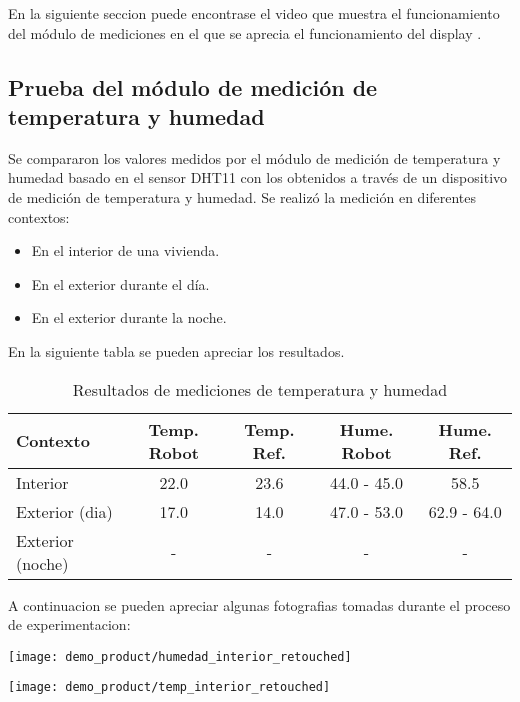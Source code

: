 En la siguiente seccion puede encontrase el video que muestra el funcionamiento del módulo de mediciones en el que se aprecia el funcionamiento del display \cite{DemoMediciones}.

\subsection{Prueba del módulo de medición de temperatura y humedad}

Se compararon los valores medidos por el módulo de medición de temperatura y humedad basado en el sensor DHT11 con los obtenidos a través de un dispositivo de medición de temperatura y humedad. Se realizó la medición en diferentes contextos:

\begin{itemize}
	\item En el interior de una vivienda.
	\item En el exterior durante el día.
	\item En el exterior durante la noche.
\end{itemize}

En la siguiente tabla se pueden apreciar los resultados.

\begin{table}[h]
\centering
\caption[Resultados de mediciones de temperatura y humedad]{Resultados de mediciones de temperatura y humedad}
\begin{tabular}{l c c c c}
\toprule
\textbf{Contexto} & \textbf{Temp. Robot} & \textbf{Temp. Ref.} & \textbf{Hume. Robot}  & \textbf{Hume. Ref.}\\
\midrule
Interior & 22.0 & 23.6 & 44.0 - 45.0 & 58.5 \\
Exterior (dia) & 17.0  & 14.0 & 47.0 - 53.0 & 62.9 - 64.0 \\
Exterior (noche) & - & - & - & - \\
\bottomrule
\hline
\end{tabular}
\end{table}

A continuacion se pueden apreciar algunas fotografias tomadas durante el proceso de experimentacion:

\begin{center}
 \texttt{[image: demo\_product/humedad\_interior\_retouched]}
   \label{fig:humedad_interior}
\end{center}

\begin{center}
 \texttt{[image: demo\_product/temp\_interior\_retouched]}
   \label{fig:humedad_interior}
\end{center}


